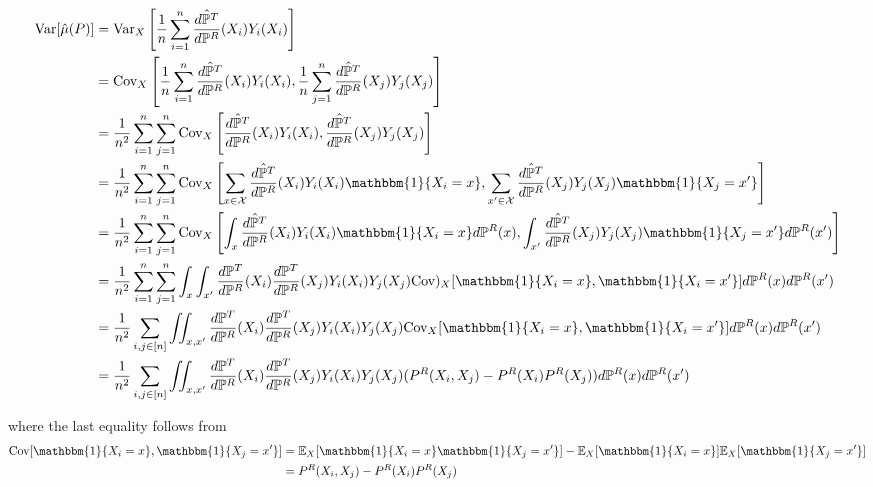 \documentclass{article}
\begin{document}
\begin{align*}
    \text{Var}[\hat{\mu}(P)] &= \text{Var}_X\left[\frac{1}{n} \sum_{i=1}^n \frac{\hat{d \mathbb{P}^T}}{d \mathbb{P}^R}(X_i)Y_i(X_i)\right] \\
    &= \text{Cov}_X\left[\frac{1}{n} \sum_{i=1}^n \frac{\hat{d \mathbb{P}^T}}{d \mathbb{P}^R}(X_i)Y_i(X_i), \frac{1}{n} \sum_{j=1}^n \frac{\hat{d \mathbb{P}^T}}{d \mathbb{P}^R}(X_j)Y_j(X_j)\right] \\
    &= \frac{1}{n^2}\sum_{i=1}^n \sum_{j=1}^n \text{Cov}_X\left[\frac{\hat{d \mathbb{P}^T}}{d \mathbb{P}^R}(X_i)Y_i(X_i), \frac{\hat{d \mathbb{P}^T}}{d \mathbb{P}^R}(X_j)Y_j(X_j)\right] \\
    &= \frac{1}{n^2}\sum_{i=1}^n \sum_{j=1}^n \text{Cov}_X\left[\sum_{x \in \mathcal{X}}\frac{\hat{d \mathbb{P}^T}}{d \mathbb{P}^R}(X_i)Y_i(X_i)\mathbbm{1}\{X_i = x\}, \sum_{x' \in \mathcal{X}}\frac{\hat{d \mathbb{P}^T}}{d \mathbb{P}^R}(X_j)Y_j(X_j)\mathbbm{1}\{X_j=x'\}\right] \\
    &= \frac{1}{n^2}\sum_{i=1}^n \sum_{j=1}^n \text{Cov}_X\left[\int_x\frac{\hat{d \mathbb{P}^T}}{d \mathbb{P}^R}(X_i)Y_i(X_i)\mathbbm{1}\{X_i = x\}d\mathbb{P}^R(x), \int_{x'}\frac{\hat{d \mathbb{P}^T}}{d \mathbb{P}^R}(X_j)Y_j(X_j)\mathbbm{1}\{X_j=x'\}d\mathbb{P}^R(x')\right] \\
    &= \frac{1}{n^2} \sum_{i=1}^n \sum_{j=1}^n \int_x \int_{x'} \frac{d \mathbb{P}^T}{d \mathbb{P}^R}(X_i)\frac{d \mathbb{P}^T}{d \mathbb{P}^R}(X_j)Y_i(X_i)Y_j(X_j) \text{Cov})_X[\mathbbm{1}\{X_i=x\}, \mathbbm{1}\{X_i=x'\}]d\mathbb{P}^R(x)d\mathbb{P}^R(x') \\
    &= \frac{1}{n^2} \sum_{i,j \in [n]} \iint_{x, x'} \frac{d \mathbb{P}^T}{d \mathbb{P}^R}(X_i)\frac{d \mathbb{P}^T}{d \mathbb{P}^R}(X_j)Y_i(X_i)Y_j(X_j) \text{Cov}_X[\mathbbm{1}\{X_i=x\}, \mathbbm{1}\{X_i=x'\}]d\mathbb{P}^R(x)d\mathbb{P}^R(x') \\
    &= \frac{1}{n^2} \sum_{i,j \in [n]} \iint_{x, x'} \frac{d \mathbb{P}^T}{d \mathbb{P}^R}(X_i)\frac{d \mathbb{P}^T}{d \mathbb{P}^R}(X_j)Y_i(X_i)Y_j(X_j) (P^R(X_i,X_j) - P^R(X_i)P^R(X_j))d\mathbb{P}^R(x)d\mathbb{P}^R(x')
\end{align*}

where the last equality follows from
\begin{equation*}
    \begin{split}
        \text{Cov}[\mathbbm{1}\{X_i=x\},\mathbbm{1}\{X_j=x'\}] &=\mathbb{E}_X[\mathbbm{1}\{X_i=x\}\mathbbm{1}\{X_j=x'\}] - \mathbb{E}_X[\mathbbm{1}\{X_i=x\}]\mathbb{E}_X[\mathbbm{1}\{X_j=x'\}] \\
        &= P^R(X_i,X_j) - P^R(X_i)P^R(X_j)
    \end{split}
\end{equation*}
\end{document}
